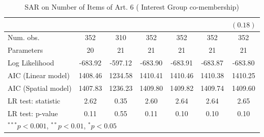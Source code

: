 \begin{table}[!h]
\begin{center}
\begin{tabular}{l c c c c c c }
                        &               &               &               &               &               & $(0.18)$      \\
\midrule
Num. obs.               & 352           & 310           & 352           & 352           & 352           & 352           \\
Parameters              & 20            & 21            & 21            & 21            & 21            & 21            \\
Log Likelihood          & -683.92       & -597.12       & -683.90       & -683.91       & -683.87       & -683.80       \\
AIC (Linear model)      & 1408.46       & 1234.58       & 1410.41       & 1410.46       & 1410.38       & 1410.25       \\
AIC (Spatial model)     & 1407.83       & 1236.23       & 1409.80       & 1409.82       & 1409.74       & 1409.60       \\
LR test: statistic      & 2.62          & 0.35          & 2.60          & 2.64          & 2.64          & 2.65          \\
LR test: p-value        & 0.11          & 0.55          & 0.11          & 0.10          & 0.10          & 0.10          \\
\bottomrule
\multicolumn{7}{l}{\scriptsize{$^{***}p<0.001$, $^{**}p<0.01$, $^*p<0.05$}}
\end{tabular}
\caption{SAR on Number of Items of Art. 6 ( Interest Group co-membership)}
\label{table:coefficients}
\end{center}
\end{table}
